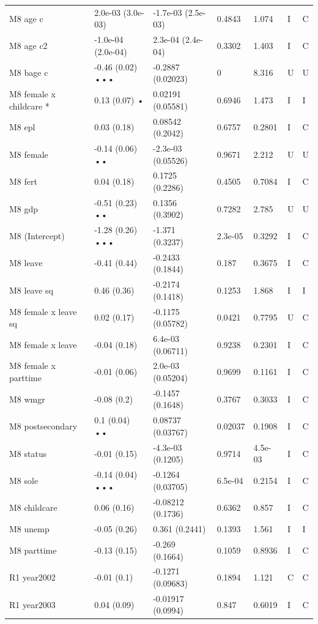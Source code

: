 {\begin{longtable}{@{}p{.245\linewidth}p{.17\linewidth}p{.17\linewidth}p{.085\linewidth}p{.060\linewidth}p{.08\linewidth}p{.07\linewidth}@{}}
M8 age c & 2.0e-03 (3.0e-03) & -1.7e-03 (2.5e-03) & 0.4843 & 1.074 & I & C\\
M8 age c2 & -1.0e-04 (2.0e-04) & 2.3e-04 (2.4e-04) & 0.3302 & 1.403 & I & C\\
M8 bage c & -0.46 (0.02) ••• & -0.2887 (0.02023) & 0 & 8.316 & U & U\\
M8 female x childcare * & 0.13 (0.07) • & 0.02191 (0.05581) & 0.6946 & 1.473 & I & I\\
M8 epl & 0.03 (0.18) & 0.08542 (0.2042) & 0.6757 & 0.2801 & I & C\\
M8 female & -0.14 (0.06) •• & -2.3e-03 (0.05526) & 0.9671 & 2.212 & U & U\\
M8 fert & 0.04 (0.18) & 0.1725 (0.2286) & 0.4505 & 0.7084 & I & C\\
M8 gdp & -0.51 (0.23) •• & 0.1356 (0.3902) & 0.7282 & 2.785 & U & U\\
M8 (Intercept) & -1.28 (0.26) ••• & -1.371 (0.3237) & 2.3e-05 & 0.3292 & I & C\\
M8 leave & -0.41 (0.44) & -0.2433 (0.1844) & 0.187 & 0.3675 & I & C\\
M8 leave sq & 0.46 (0.36) & -0.2174 (0.1418) & 0.1253 & 1.868 & I & I\\
M8 female x leave sq & 0.02 (0.17) & -0.1175 (0.05782) & 0.0421 & 0.7795 & U & C\\
M8 female x leave & -0.04 (0.18) & 6.4e-03 (0.06711) & 0.9238 & 0.2301 & I & C\\
M8 female x parttime & -0.01 (0.06) & 2.0e-03 (0.05204) & 0.9699 & 0.1161 & I & C\\
M8 wmgr & -0.08 (0.2) & -0.1457 (0.1648) & 0.3767 & 0.3033 & I & C\\
M8 postsecondary & 0.1 (0.04) •• & 0.08737 (0.03767) & 0.02037 & 0.1908 & I & C\\
M8 status & -0.01 (0.15) & -4.3e-03 (0.1205) & 0.9714 & 4.5e-03 & I & C\\
M8 sole & -0.14 (0.04) ••• & -0.1264 (0.03705) & 6.5e-04 & 0.2154 & I & C\\
M8 childcare & 0.06 (0.16) & -0.08212 (0.1736) & 0.6362 & 0.857 & I & C\\
M8 unemp & -0.05 (0.26) & 0.361 (0.2441) & 0.1393 & 1.561 & I & I\\
M8 parttime & -0.13 (0.15) & -0.269 (0.1664) & 0.1059 & 0.8936 & I & C\\
R1 year2002 & -0.01 (0.1) & -0.1271 (0.09683) & 0.1894 & 1.121 & C & C\\
R1 year2003 & 0.04 (0.09) & -0.01917 (0.0994) & 0.847 & 0.6019 & I & C\\

\end{longtable}}
